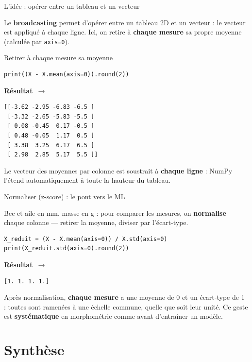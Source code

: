 \documentclass[aspectratio=169,11pt]{beamer}
\newcommand{\resultat}{{\scriptsize\textbf{R\'esultat}~$\rightarrow$}\par\vspace{1pt}}
\begin{document}
\begin{frame}{L'idée : opérer entre un tableau et un vecteur}
\begin{ucaddef}
{\small Le \textbf{broadcasting} permet d'opérer entre un tableau 2D et un vecteur : le vecteur est appliqué à chaque ligne. Ici, on retire à \textbf{chaque mesure} sa propre moyenne (calculée par \texttt{axis=0}).}
\end{ucaddef}
\end{frame}

\begin{frame}[fragile]{Retirer à chaque mesure sa moyenne}
\begin{lstlisting}
print((X - X.mean(axis=0)).round(2))
\end{lstlisting}
\resultat
\begin{lstlisting}[style=out]
[[-3.62 -2.95 -6.83 -6.5 ]
 [-3.32 -2.65 -5.83 -5.5 ]
 [ 0.08 -0.45  0.17 -0.5 ]
 [ 0.48 -0.05  1.17  0.5 ]
 [ 3.38  3.25  6.17  6.5 ]
 [ 2.98  2.85  5.17  5.5 ]]
\end{lstlisting}
{\small Le vecteur des moyennes par colonne est soustrait à \textbf{chaque ligne} : NumPy l'étend automatiquement à toute la hauteur du tableau.}
\end{frame}

\begin{frame}[fragile]{Normaliser (z-score) : le pont vers le ML}
\begin{ucadex}
{\small Bec et aile en mm, masse en g : pour comparer les mesures, on \textbf{normalise} chaque colonne — retirer la moyenne, diviser par l'écart-type.}
\end{ucadex}
\begin{lstlisting}
X_reduit = (X - X.mean(axis=0)) / X.std(axis=0)
print(X_reduit.std(axis=0).round(2))
\end{lstlisting}
\resultat
\begin{lstlisting}[style=out]
[1. 1. 1. 1.]
\end{lstlisting}
{\small Après normalisation, \textbf{chaque mesure} a une moyenne de 0 et un écart-type de 1 : toutes sont ramenées à une échelle commune, quelle que soit leur unité. Ce geste est \textbf{systématique} en morphométrie comme avant d'entraîner un modèle.}
\end{frame}

\section{Synthèse}
\end{document}
